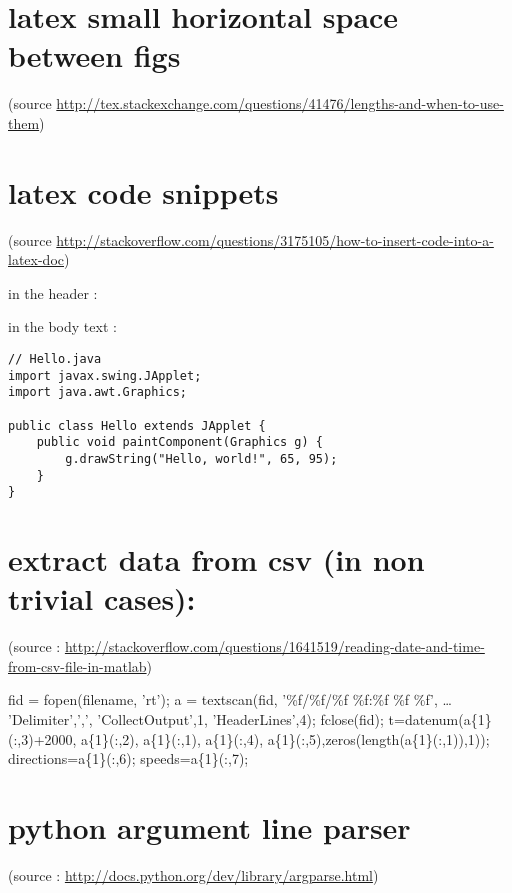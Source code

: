 \documentclass[11pt]{article}
\begin{document}
\section{latex small horizontal space between figs}
\label{sec-15}
(source \url{http://tex.stackexchange.com/questions/41476/lengths-and-when-to-use-them})
\enskip

\section{latex code snippets}
\label{sec-16}
(source \url{http://stackoverflow.com/questions/3175105/how-to-insert-code-into-a-latex-doc})

in the header : 
\usepackage{listings}
\usepackage{color}



in the body text :
\begin{lstlisting}
// Hello.java
import javax.swing.JApplet;
import java.awt.Graphics;

public class Hello extends JApplet {
    public void paintComponent(Graphics g) {
        g.drawString("Hello, world!", 65, 95);
    }    
}
\end{lstlisting}

\section{extract data from csv (in non trivial cases):}
\label{sec-17}

(source : \url{http://stackoverflow.com/questions/1641519/reading-date-and-time-from-csv-file-in-matlab})

fid = fopen(filename, 'rt');
a = textscan(fid, '\%f/\%f/\%f \%f:\%f \%f \%f', \ldots{}
      'Delimiter',',', 'CollectOutput',1, 'HeaderLines',4);
fclose(fid);
t=datenum(a\{1\}(:,3)+2000, a\{1\}(:,2), a\{1\}(:,1), a\{1\}(:,4), a\{1\}(:,5),zeros(length(a\{1\}(:,1)),1));
directions=a\{1\}(:,6);
speeds=a\{1\}(:,7);

\section{python argument line parser}
\label{sec-18}
(source : \url{http://docs.python.org/dev/library/argparse.html})
\end{document}
